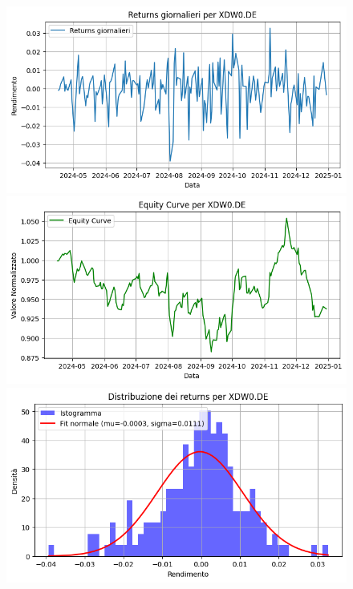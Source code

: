 \documentclass{article}%
\begin{document}
\begin{figure}[htbp]%
\begin{minipage}{0.31\textwidth}%
\includegraphics[width=\linewidth]{immagini_tickers/XDW0.DE_returns_plot.png}%
\end{minipage}%
\begin{minipage}{0.31\textwidth}%
\includegraphics[width=\linewidth]{immagini_tickers/XDW0.DE_equity_curve.png}%
\end{minipage}%
\begin{minipage}{0.31\textwidth}%
\includegraphics[width=\linewidth]{immagini_tickers/XDW0.DE_distribuzione_returns.png}%
\end{minipage}%
\end{figure}
\end{document}
